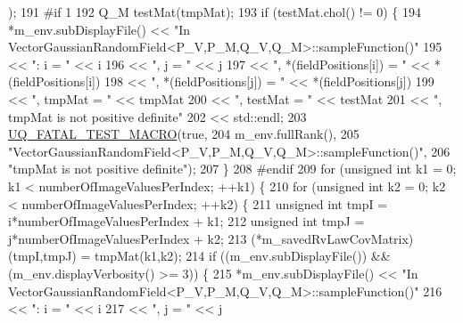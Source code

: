 \begin{DoxyCode}
      );
191 \textcolor{preprocessor}{#if 1}
192 \textcolor{preprocessor}{}        Q\_M testMat(tmpMat);
193         \textcolor{keywordflow}{if} (testMat.chol() != 0) \{
194           *m\_env.subDisplayFile() << \textcolor{stringliteral}{"In VectorGaussianRandomField<P\_V,P\_M,Q\_V,Q\_M>::sampleFunction()"}
195                                   << \textcolor{stringliteral}{": i = "} << i
196                                   << \textcolor{stringliteral}{", j = "} << j
197                                   << \textcolor{stringliteral}{", *(fieldPositions[i]) = "} << *(fieldPositions[i])
198                                   << \textcolor{stringliteral}{", *(fieldPositions[j]) = "} << *(fieldPositions[j])
199                                   << \textcolor{stringliteral}{", tmpMat = "}               << tmpMat
200                                   << \textcolor{stringliteral}{", testMat = "}              << testMat
201                                   << \textcolor{stringliteral}{", tmpMat is not positive definite"}
202                                   << std::endl;
203           \hyperlink{_defines_8h_a56d63d18d0a6d45757de47fcc06f574d}{UQ\_FATAL\_TEST\_MACRO}(\textcolor{keyword}{true},
204                               m\_env.fullRank(),
205                               \textcolor{stringliteral}{"VectorGaussianRandomField<P\_V,P\_M,Q\_V,Q\_M>::sampleFunction()"},
206                               \textcolor{stringliteral}{"tmpMat is not positive definite"});
207         \}
208 \textcolor{preprocessor}{#endif}
209 \textcolor{preprocessor}{}        \textcolor{keywordflow}{for} (\textcolor{keywordtype}{unsigned} \textcolor{keywordtype}{int} k1 = 0; k1 < numberOfImageValuesPerIndex; ++k1) \{
210           \textcolor{keywordflow}{for} (\textcolor{keywordtype}{unsigned} \textcolor{keywordtype}{int} k2 = 0; k2 < numberOfImageValuesPerIndex; ++k2) \{
211             \textcolor{keywordtype}{unsigned} \textcolor{keywordtype}{int} tmpI = i*numberOfImageValuesPerIndex + k1;
212             \textcolor{keywordtype}{unsigned} \textcolor{keywordtype}{int} tmpJ = j*numberOfImageValuesPerIndex + k2;
213             (*m\_savedRvLawCovMatrix)(tmpI,tmpJ) = tmpMat(k1,k2);
214             \textcolor{keywordflow}{if} ((m\_env.subDisplayFile()) && (m\_env.displayVerbosity() >= 3)) \{
215               *m\_env.subDisplayFile() << \textcolor{stringliteral}{"In VectorGaussianRandomField<P\_V,P\_M,Q\_V,Q\_M>::sampleFunction()"}
216                                       << \textcolor{stringliteral}{": i = "} << i
217                                       << \textcolor{stringliteral}{", j = "} << j

\end{DoxyCode}

